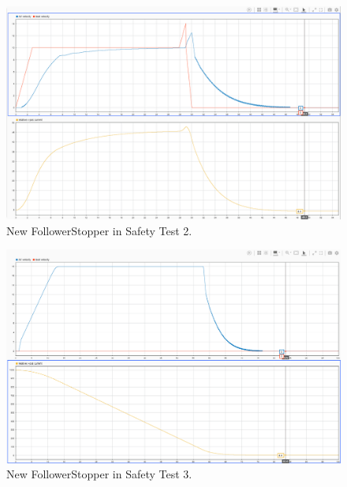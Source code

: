 \documentclass[conference]{IEEEtran}
\begin{document}
\begin{appendix}
\begin{figure}[htbp]
\centerline{\includegraphics[width=6.50 in]{newFS_safety2.png}}
\caption{New FollowerStopper in Safety Test 2.}
\label{fig3}
\end{figure}

\begin{figure}[htbp]
\centerline{\includegraphics[width=6.50 in]{newFS_safety3.png}}
\caption{New FollowerStopper in Safety Test 3.}
\label{fig3}
\end{figure}


\end{appendix}
\end{document}
